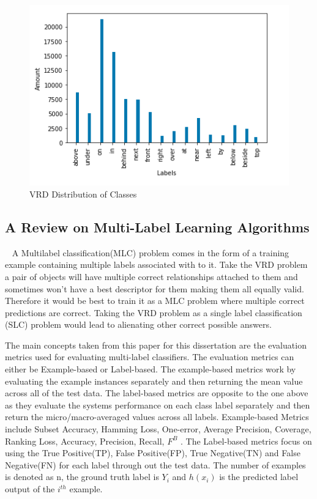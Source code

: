 \documentclass{csfyp}
\begin{document}
\begin{figure}[!htbp]
	\includegraphics[scale=0.60,center]{VRD_Labels.pdf}
	\caption{VRD Distribution of Classes}
\end{figure}

\subsection{A Review on Multi-Label Learning Algorithms}
~\cite{6471714} A Multilabel classification(MLC) problem comes in the form of a training example containing multiple labels associated with to it. Take the VRD problem a pair of objects will have multiple correct relationships attached to them and sometimes won't have a best descriptor for them making them all equally valid. Therefore it would be best to train it as a MLC problem where multiple correct predictions are correct. Taking the VRD problem as a single label classification (SLC) problem would lead to alienating other correct possible answers. 

The main concepts taken from this paper for this dissertation are the evaluation metrics used for evaluating multi-label classifiers. The evaluation metrics can either be Example-based or Label-based. The example-based metrics work by evaluating the example instances separately and then returning the mean value across all of the test data. The label-based metrics are opposite to the one above as they evaluate the systems performance on each class label separately and then return the micro/macro-averaged values across all labels. Example-based Metrics include Subset Accuracy, Hamming Loss, One-error, Average Precision, Coverage, Ranking Loss, Accuracy, Precision, Recall, $F^B$ . The Label-based metrics focus on using the True Positive(TP), False Positive(FP), True Negative(TN) and False Negative(FN) for each label through out the test data. The number of examples is denoted as n, the ground truth label is $Y_{i}$ and $h(x_{i})$ is the predicted label output of the $i^{th}$ example.
\end{document}
